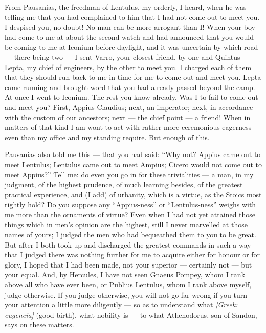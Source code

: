  From Pausanias, the freedman of Lentulus, my orderly, I heard, when he was telling me that you had complained to him that I had not come out to meet you. I despised you, no doubt! No man can be more arrogant than I! When your boy had come to me at about the second watch and had announced that you would be coming to me at Iconium before daylight, and it was uncertain by which road --- there being two --- I sent Varro, your closest friend, by one and Quintus Lepta, my chief of engineers, by the other to meet you. I charged each of them that they should run back to me in time for me to come out and meet you. Lepta came running and brought word that you had already passed beyond the camp. At once I went to Iconium. The rest you know already. Was I to fail to come out and meet you? First, Appius Claudius; next, an imperator; next, in accordance with the custom of our ancestors; next --- the chief point --- a friend! When in matters of that kind I am wont to act with rather more ceremonious eagerness even than my office and my standing require. But enough of this.

 Pausanias also told me this --- that you had said: ``Why not? Appius came out to meet Lentulus; Lentulus came out to meet Ampius; Cicero would not come out to meet Appius?'' Tell me: do even you go in for these trivialities --- a man, in my judgment, of the highest prudence, of much learning besides, of the greatest practical experience, and (I add) of urbanity, which is a virtue, as the Stoics most rightly hold? Do you suppose any ``Appius-ness'' or ``Lentulus-ness'' weighs with me more than the ornaments of virtue? Even when I had not yet attained those things which in men's opinion are the highest, still I never marvelled at those names of yours; I judged the men who had bequeathed them to you to be great. But after I both took up and discharged the greatest commands in such a way that I judged there was nothing further for me to acquire either for honour or for glory, I hoped that I had been made, not your superior --- certainly not --- but your equal. And, by Hercules, I have not seen Gnaeus Pompey, whom I rank above all who have ever been, or Publius Lentulus, whom I rank above myself, judge otherwise. If you judge otherwise, you will not go far wrong if you turn your attention a little more diligently --- so as to understand what \textit{[Greek: eugeneia]} (good birth), what nobility is --- to what Athenodorus, son of Sandon, says on these matters.

